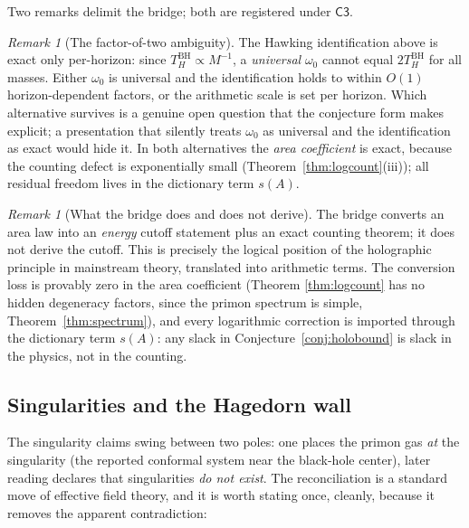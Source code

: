 \documentclass[11pt,a4paper]{article}
\theoremstyle{plain}
\theoremstyle{definition}
\theoremstyle{remark}
\newtheorem{remark}[theorem]{Remark}
\begin{document}
Two remarks delimit the bridge; both are registered under $\mathsf{C3}$.

\begin{remark}[The factor-of-two ambiguity]
The Hawking identification above is exact only per-horizon: since $T_{H}^{\mathrm{BH}}\propto
M^{-1}$, a \emph{universal} $\omega_{0}$ cannot equal $2T_{H}^{\mathrm{BH}}$ for all masses.
Either $\omega_{0}$ is universal and the identification holds to within
$O(1)$ horizon-dependent factors, or the arithmetic scale is set per horizon. Which
alternative survives is a genuine open question that the conjecture form makes explicit;
a presentation that silently treats $\omega_{0}$ as universal and the
identification as exact would hide it. In both alternatives the \emph{area coefficient} is
exact, because the counting defect is exponentially small (Theorem~\ref{thm:logcount}(iii));
all residual freedom lives in the dictionary term $s(A)$.
\end{remark}

\begin{remark}[What the bridge does and does not derive]
The bridge converts an area law into an \emph{energy} cutoff statement plus an exact
counting theorem; it does not derive the cutoff. This is precisely the logical position of
the holographic principle in mainstream theory, translated into arithmetic terms. The
conversion loss is provably zero in the area coefficient (Theorem
\ref{thm:logcount} has no hidden degeneracy factors, since the primon spectrum is simple,
Theorem~\ref{thm:spectrum}), and every logarithmic correction is imported through the
dictionary term $s(A)$: any slack in Conjecture~\ref{conj:holobound} is slack in the
physics, not in the counting.
\end{remark}

\subsection{Singularities and the Hagedorn wall}

The singularity claims swing between two poles: one places the primon gas
\emph{at} the singularity (the reported conformal system near the black-hole center), later
reading declares that singularities \emph{do not exist}. The reconciliation is a standard
move of effective field theory, and it is worth stating once, cleanly, because it removes
the apparent contradiction:
\end{document}

